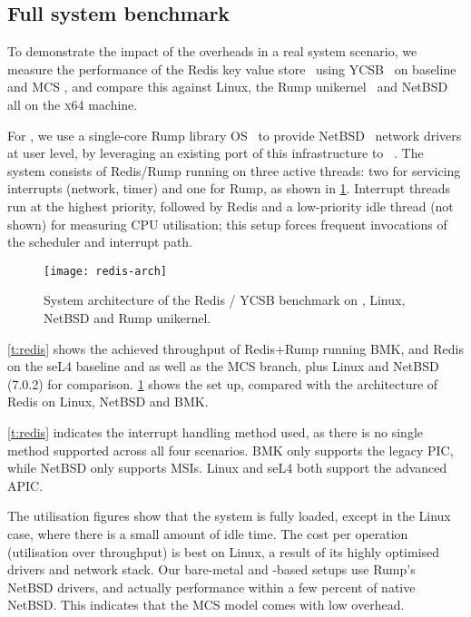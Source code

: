 \subsection{Full system benchmark}
\label{s:evaluation-redis-overhead}

To demonstrate the impact of the overheads in a real system scenario, 
we measure the performance of the Redis key value store~\citep{redis:url} using 
\gls{YCSB}~\citep{Cooper_STRS_10} on baseline and MCS \selfour, and compare this
against Linux, the Rump unikernel~\citep{Kantee_Cormack_14} and 
NetBSD~\citep{NetBSD:url} all on the \textsc{x64} machine.

For \selfour, we use a single-core Rump library OS~\citep{Kantee_Cormack_14} to provide 
NetBSD~\citep{NetBSD:url} network drivers at user level, by leveraging an existing port of this infrastructure
to \selfour~\citep{McCleod:be}.
The system consists of Redis/Rump running on three active \selfour threads: 
two for servicing interrupts (network, timer) and one for Rump, as shown in
\cref{f:redis-arch}. Interrupt threads run at the highest priority,
followed by Redis and a low-priority idle thread (not shown) for measuring CPU utilisation;
this setup forces frequent invocations of the scheduler and interrupt path.

 \begin{figure}[ht]
    \centering
    \texttt{[image: redis-arch]}
    \caption[System architecture of Redis benchmark.]{System architecture of the Redis / \gls{YCSB} benchmark on \selfour, 
        Linux, NetBSD and Rump unikernel.}
    \label{f:redis-arch}
\end{figure}

\cref{t:redis} shows the achieved throughput of Redis+Rump
running \gls{BMK}, and Redis on the seL4 baseline and as well as the MCS
branch, plus Linux and NetBSD (7.0.2) for comparison. \cref{f:redis-arch} shows the \selfour set up,
compared with the architecture of Redis on Linux, NetBSD and \gls{BMK}. 

\cref{t:redis} indicates the interrupt handling method used, as there is no single method supported
across all four scenarios. \gls{BMK} only supports the legacy
\gls{PIC},
while NetBSD only supports \glspl{MSI}. Linux and seL4 both support the
advanced \gls{APIC}.

The utilisation figures show that the system is fully loaded, except
in the Linux case, where there is a small amount of idle time. The
cost per operation (utilisation over throughput) is best on Linux, a
result of its highly optimised drivers and network stack. Our
bare-metal and \selfour-based setups use Rump's NetBSD drivers, and
actually performance within a few percent of native NetBSD. This
indicates that the MCS model comes with low overhead.

